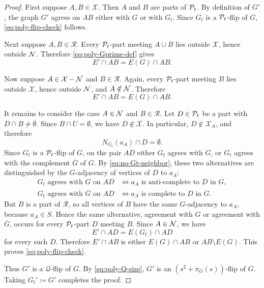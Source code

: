 \begin{proof}
First suppose \(A,B\in\mathcal X\). Then \(A\) and \(B\) are parts of
\(\cal P_t\). By definition of \(G'\), the graph \(G'\) agrees on \(AB\) either
with \(G\) or with \(G_t\). Since \(G_t\) is a \(\cal P_t\)-flip of \(G\),
\eqref{eq:poly-flip-check} follows.

Next suppose \(A,B\in\mathcal R\). Every \(\cal P_t\)-part meeting \(A\cup B\)
lies outside \(\mathcal X\), hence outside \(\cal N\). Therefore
\eqref{eq:poly-Gprime-def} gives
\[
   E'\cap AB=E(G)\cap AB.
\]

Now suppose \(A\in\mathcal X\setminus\cal N\) and \(B\in\mathcal R\).
Again, every \(\cal P_t\)-part meeting \(B\) lies outside \(\mathcal X\), hence
outside \(\cal N\), and \(A\notin\cal N\). Therefore
\[
   E'\cap AB=E(G)\cap AB.
\]

It remains to consider the case \(A\in\cal N\) and \(B\in\mathcal R\).
Let \(D\in\cal P_t\) be a part with \(D\cap B\neq\emptyset\). Since
\(B\cap U=\emptyset\), we have \(D\notin\mathcal X\). In particular,
\(D\notin\mathcal X_A\), and therefore
\[
   N_{G_t}(a_A)\cap D=\emptyset.
\tag{4}\label{eq:no-Gt-neighbor}
\]
Since \(G_t\) is a \(\cal P_t\)-flip of \(G\), on the pair \(AD\) either
\(G_t\) agrees with \(G\), or \(G_t\) agrees with the complement $\overline G$ of \(G\). By
\eqref{eq:no-Gt-neighbor}, these two alternatives are distinguished by the
\(G\)-adjacency of vertices of \(D\) to \(a_A\):
\[
\begin{array}{ll}
G_t \text{ agrees with } G \text{ on } AD
   &\Longleftrightarrow
   a_A \text{ is anti-complete to } D \text{ in } G,\\[1mm]
G_t \text{ agrees with } \overline G \text{ on } AD
   &\Longleftrightarrow
   a_A \text{ is complete to } D \text{ in } G.
\end{array}
\]
But \(B\) is a part of \(\mathcal R\), so all vertices of \(B\) have the same
\(G\)-adjacency to \(a_A\), because \(a_A\in S\). Hence the same alternative,
agreement with \(G\) or agreement with \(\overline G\), occurs for every
\(\cal P_t\)-part \(D\) meeting \(B\). Since \(A\in\cal N\), we have
\[
   E'\cap AD=E(G_t)\cap AD
\]
for every such \(D\). Therefore \(E'\cap AB\) is either \(E(G)\cap AB\) or
\(AB\setminus E(G)\). This proves \eqref{eq:poly-flip-check}.

Thus \(G'\) is a \(\mathcal Q\)-flip of \(G\). By
\eqref{eq:poly-Q-size}, \(G'\) is an \((s^2+\pi_G(s))\)-flip of \(G\). Taking
\(G_t'\coloneqq G'\) completes the proof.
\end{proof}


